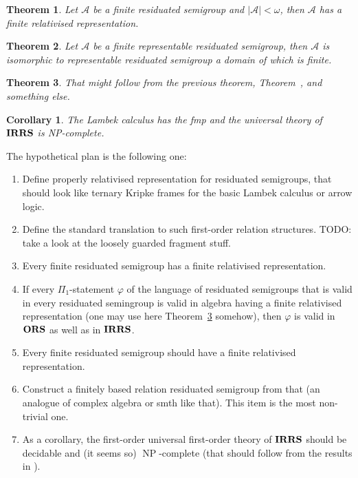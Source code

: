 \documentclass[a4paper]{article}
\theoremstyle{defin}
\theoremstyle{theorem}
\newtheorem{theorem}{Theorem}
\theoremstyle{prop}
\theoremstyle{lemma}
\theoremstyle{ex}
\theoremstyle{col}
\newtheorem{col}{Corollary}
\begin{document}
\begin{theorem}
  Let $\mathcal{A}$ be a finite residuated semigroup and
  $|\mathcal{A}| < \omega$, then $\mathcal{A}$ has a finite relativised representation.
\end{theorem}

\begin{theorem}
  Let $\mathcal{A}$ be a finite representable residuated semigroup, then $\mathcal{A}$ is isomorphic to
  representable residuated semigroup a domain of which is finite.
\end{theorem}

\begin{theorem}
  That might follow from the previous theorem, Theorem~\label{ors=irrs}, and something else.
\end{theorem}

\begin{col}
  The Lambek calculus has the fmp and the universal theory of ${\bf IRRS}$ is NP-complete.
\end{col}

The hypothetical plan is the following one:
\begin{enumerate}
\item Define properly relativised representation for residuated semigroups, that should look like ternary Kripke frames for the basic Lambek calculus or arrow logic.
\item Define the standard translation to such first-order relation structures. TODO: take a look at the loosely guarded fragment stuff.
\item Every finite residuated semigroup has a finite relativised representation.
\item If every $\Pi_1$-statement $\varphi$ of the language of residuated semigroups that is valid in every
residuated semingroup is valid in algebra having a finite relativised representation (one may use here Theorem~\ref{ors=irrs} somehow), then $\varphi$ is valid in ${\bf ORS}$ as well as in ${\bf IRRS}$.
\item Every finite residuated semigroup should have a finite relativised representation.
\item Construct a finitely based relation residuated semigroup from that (an analogue of complex algebra or smth like that). This item is the most non-trivial one.
\item As a corollary, the first-order universal first-order theory of ${\bf IRRS}$ should be decidable and
(it seems so) $\operatorname{NP}$-complete (that should follow from the results in \cite{pentus2006lambek}).
\end{enumerate}
\end{document}
